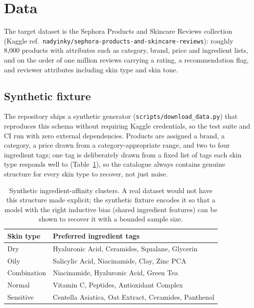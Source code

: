 \section{Data}
\label{sec:data}

The target dataset is the Sephora Products and Skincare Reviews collection
(Kaggle ref.\ \texttt{nadyinky/sephora-products-and-skincare-reviews}):
roughly 8{,}000 products with attributes such as category, brand, price and
ingredient lists, and on the order of one million reviews carrying a rating,
a recommendation flag, and reviewer attributes including skin type and skin
tone.

\subsection{Synthetic fixture}

The repository ships a synthetic generator
(\texttt{scripts/download\_data.py}) that reproduces this schema without
requiring Kaggle credentials, so the test suite and CI run with zero external
dependencies. Products are assigned a brand, a category, a price drawn from a
category-appropriate range, and two to four ingredient tags; one tag is
deliberately drawn from a fixed list of tags each skin type responds well to
(Table~\ref{tab:skin-affinity}), so the catalogue always contains genuine
structure for every skin type to recover, not just noise.

\begin{table}[h]
  \centering
  \caption{Synthetic ingredient-affinity clusters. A real dataset would not
  have this structure made explicit; the synthetic fixture encodes it so
  that a model with the right inductive bias (shared ingredient features)
  can be shown to recover it with a bounded sample size.}
  \label{tab:skin-affinity}
  \begin{tabular}{ll}
    \toprule
    Skin type & Preferred ingredient tags \\
    \midrule
    Dry & Hyaluronic Acid, Ceramides, Squalane, Glycerin \\
    Oily & Salicylic Acid, Niacinamide, Clay, Zinc PCA \\
    Combination & Niacinamide, Hyaluronic Acid, Green Tea \\
    Normal & Vitamin C, Peptides, Antioxidant Complex \\
    Sensitive & Centella Asiatica, Oat Extract, Ceramides, Panthenol \\
    \bottomrule
  \end{tabular}
\end{table}

